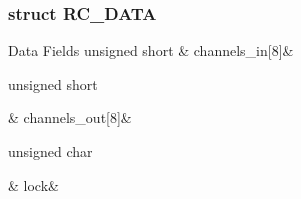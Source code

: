 \subsubsection{struct R\-C\-\_\-\-D\-A\-T\-A}
\begin{DoxyFields}{Data Fields}
\hypertarget{a00004_a64c9aef9bf2d42d83cb05d250ab4ec3a}{unsigned short}\label{a00004_a64c9aef9bf2d42d83cb05d250ab4ec3a}
&
channels\-\_\-in\mbox{[}8\mbox{]}&
\\
\hline

\hypertarget{a00004_a9ece938051bc16291613a2bdccd52bec}{unsigned short}\label{a00004_a9ece938051bc16291613a2bdccd52bec}
&
channels\-\_\-out\mbox{[}8\mbox{]}&
\\
\hline

\hypertarget{a00004_a6ae861576031be7ecfd4d6c9e870fb99}{unsigned char}\label{a00004_a6ae861576031be7ecfd4d6c9e870fb99}
&
lock&
\\
\hline

\end{DoxyFields}
\label{dd/d42/a00109}
\hypertarget{a00004_dd/d42/a00109}{}
